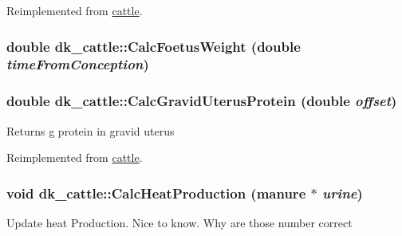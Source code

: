 Reimplemented from \hyperlink{classcattle_a8643521d1530588eeff5d92013063038}{cattle}.\hypertarget{classdk__cattle_ae2808ab57881060f11d0109a9a489798}{
\subsubsection[{CalcFoetusWeight}]{\setlength{\rightskip}{0pt plus 5cm}double dk\_\-cattle::CalcFoetusWeight (double {\em timeFromConception})}}
\label{classdk__cattle_ae2808ab57881060f11d0109a9a489798}
\hypertarget{classdk__cattle_a86bb4b01472df3578ac25b97d39af5b8}{
\subsubsection[{CalcGravidUterusProtein}]{\setlength{\rightskip}{0pt plus 5cm}double dk\_\-cattle::CalcGravidUterusProtein (double {\em offset})}}
\label{classdk__cattle_a86bb4b01472df3578ac25b97d39af5b8}
Returns g protein in gravid uterus 

Reimplemented from \hyperlink{classcattle_ababba75682af1059250b4a92eedd4a64}{cattle}.\hypertarget{classdk__cattle_af224d866e6cffe1530ecd307d518c4e7}{
\subsubsection[{CalcHeatProduction}]{\setlength{\rightskip}{0pt plus 5cm}void dk\_\-cattle::CalcHeatProduction ({\bf manure} $\ast$ {\em urine})}}
\label{classdk__cattle_af224d866e6cffe1530ecd307d518c4e7}
Update heat Production. Nice to know. Why are those number correct 

